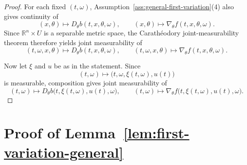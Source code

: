\documentclass[11pt]{amsart}
\numberwithin{equation}{section} %
\theoremstyle{remark}
\begin{document}
\begin{proof}
For each fixed $(t,\omega)$,
Assumption~\ref{ass:general-first-variation}(4) also gives continuity
of
\[
(x,\theta)
\longmapsto
D_\theta b(t,x,\theta,\omega),
\qquad
(x,\theta)
\longmapsto
\nabla_\theta f(t,x,\theta,\omega).
\]
Since $\mathbb R^n\times U$ is a separable metric space, the
Carath\'eodory joint-measurability theorem therefore yields joint
measurability of
\[
(t,\omega,x,\theta)
\longmapsto
D_\theta b(t,x,\theta,\omega),
\qquad
(t,\omega,x,\theta)
\longmapsto
\nabla_\theta f(t,x,\theta,\omega).
\]

Now let $\xi$ and $u$ be as in the statement.
Since
\[
(t,\omega)
\longmapsto
\bigl(t,\omega,\xi(t,\omega),u(t)\bigr)
\]
is measurable, composition gives joint measurability of
\[
(t,\omega)
\longmapsto
D_\theta b
\bigl(t,\xi(t,\omega),u(t),\omega\bigr),
\qquad
(t,\omega)
\longmapsto
\nabla_\theta f
\bigl(t,\xi(t,\omega),u(t),\omega\bigr).
\]
\end{proof}

\section{Proof of Lemma~\ref{lem:first-variation-general}}\label{app:proof_first_variation_general}
\end{document}
